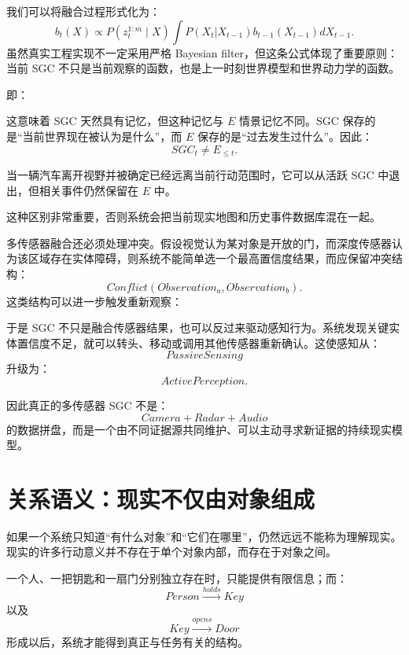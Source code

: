 我们可以将融合过程形式化为：
\[
b_t(X)
\propto
P(z_t^{1:m}\mid X)
\int
P(X_t|X_{t-1})
b_{t-1}(X_{t-1})
dX_{t-1}.
\]
虽然真实工程实现不一定采用严格 Bayesian filter，但这条公式体现了重要原则：当前 SGC 不只是当前观察的函数，也是上一时刻世界模型和世界动力学的函数。

即：
\begin{statementbox}
\centering
{}
\end{statementbox}

这意味着 SGC 天然具有记忆，但这种记忆与 \(E\) 情景记忆不同。SGC 保存的是“当前世界现在被认为是什么”，而 \(E\) 保存的是“过去发生过什么”。因此：
\[
SGC_t
\neq
E_{\leq t}.
\]

当一辆汽车离开视野并被确定已经远离当前行动范围时，它可以从活跃 SGC 中退出，但相关事件仍然保留在 \(E\) 中。

这种区别非常重要，否则系统会把当前现实地图和历史事件数据库混在一起。

多传感器融合还必须处理冲突。假设视觉认为某对象是开放的门，而深度传感器认为该区域存在实体障碍，则系统不能简单选一个最高置信度结果，而应保留冲突结构：
\[
Conflict(
Observation_a,
Observation_b
).
\]
这类结构可以进一步触发重新观察：
\begin{statementbox}
\centering
{}
\end{statementbox}

于是 SGC 不只是融合传感器结果，也可以反过来驱动感知行为。系统发现关键实体置信度不足，就可以转头、移动或调用其他传感器重新确认。这使感知从：
\[
PassiveSensing
\]
升级为：
\[
ActivePerception.
\]

因此真正的多传感器 SGC 不是：
\[
Camera + Radar + Audio
\]
的数据拼盘，而是一个由不同证据源共同维护、可以主动寻求新证据的持续现实模型。

\section{关系语义：现实不仅由对象组成}

如果一个系统只知道“有什么对象”和“它们在哪里”，仍然远远不能称为理解现实。现实的许多行动意义并不存在于单个对象内部，而存在于对象之间。

一个人、一把钥匙和一扇门分别独立存在时，只能提供有限信息；而：
\[
Person
\xrightarrow{holds}
Key
\]
以及
\[
Key
\xrightarrow{opens}
Door
\]
形成以后，系统才能得到真正与任务有关的结构。

